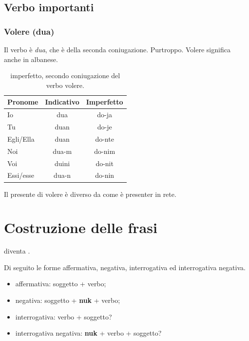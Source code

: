 \subsection{Verbo importanti}

\subsubsection{Volere (dua)}

Il verbo è \textit{dua}, che è della seconda coniugazione. Purtroppo.
Volere significa anche  in albanese.

\begin{table}[H]
    \centering
    \begin{tabular}{lcc}
        \toprule
        Pronome     &   Indicativo & Imperfetto \\
        \midrule
        Io          &   dua & do-ja \\
        Tu          &   duan & do-je \\
        Egli/Ella   &   duan & do-nte \\
        Noi         &   dua-m & do-nim \\
        Voi         &   duini & do-nit \\
        Essi/esse   &   dua-n & do-nin \\
        \bottomrule
    \end{tabular}
    \caption{imperfetto, secondo coniugazione del verbo volere.}
    \label{tbl:verb:secondaconiugazione:imperfetto}
\end{table}

Il presente di volere è diverso da come è presenter in rete\cite{angjelina}.

\section{Costruzione delle frasi}

 diventa .

Di seguito le forme affermativa, negativa, interrogativa ed interrogativa negativa.

\begin{itemize}
    \item affermativa: soggetto + verbo;
    \item negativa: soggetto + \textbf{nuk} + verbo;
    \item interrogativa: verbo + soggetto?
    \item interrogativa negativa: \textbf{nuk} + verbo + soggetto?
\end{itemize}

